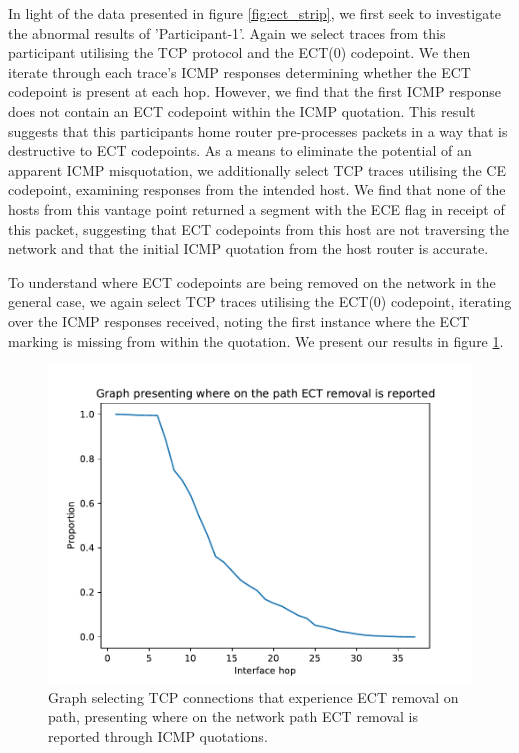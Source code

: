\documentclass{l4proj}
\begin{document}
In light of the data presented in figure \ref{fig:ect_strip}, we first seek to investigate the abnormal results of 'Participant-1'. Again we select traces from this participant utilising the TCP protocol and the ECT(0) codepoint. We then iterate through each trace's ICMP responses determining whether the ECT codepoint is present at each hop. However, we find that the first ICMP response does not contain an ECT codepoint within the ICMP quotation. This result suggests that this participants home router pre-processes packets in a way that is destructive to ECT codepoints. As a means to eliminate the potential of an apparent ICMP misquotation, we additionally select TCP traces utilising the CE codepoint, examining responses from the intended host. We find that none of the hosts from this vantage point returned a segment with the ECE flag in receipt of this packet, suggesting that ECT codepoints from this host are not traversing the network and that the initial ICMP quotation from the host router is accurate.

To understand where ECT codepoints are being removed on the network in the general case, we again select TCP traces utilising the ECT(0) codepoint, iterating over the ICMP responses received, noting the first instance where the ECT marking is missing from within the quotation. We present our results in figure \ref{fig:tcppreserve}.

\begin{figure}[H]
    \centering
    \includegraphics[scale=0.70]{dissertation/images/preservetcp.pdf}
    \caption{Graph selecting TCP connections that experience ECT removal on path, presenting where on the network path ECT removal is reported through ICMP quotations.}
    \label{fig:tcppreserve}
\end{figure}
\end{document}
